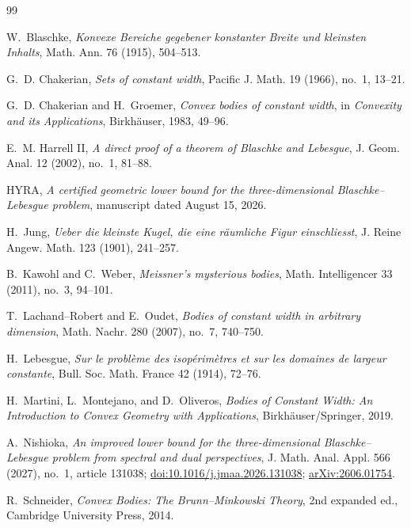 \documentclass[11pt,reqno]{amsart}
\theoremstyle{remark}
\begin{document}
\begin{thebibliography}{99}

W.~Blaschke,
\emph{Konvexe Bereiche gegebener konstanter Breite und kleinsten Inhalts},
Math. Ann. 76 (1915), 504--513.

G.~D. Chakerian,
\emph{Sets of constant width},
Pacific J. Math. 19 (1966), no.~1, 13--21.

G.~D. Chakerian and H.~Groemer,
\emph{Convex bodies of constant width},
in \emph{Convexity and its Applications}, Birkh\"auser, 1983, 49--96.

E.~M. Harrell II,
\emph{A direct proof of a theorem of Blaschke and Lebesgue},
J. Geom. Anal. 12 (2002), no.~1, 81--88.

HYRA,
\emph{A certified geometric lower bound for the three-dimensional
Blaschke--Lebesgue problem}, manuscript dated August 15, 2026.

H.~Jung,
\emph{Ueber die kleinste Kugel, die eine r\"aumliche Figur einschliesst},
J. Reine Angew. Math. 123 (1901), 241--257.

B.~Kawohl and C.~Weber,
\emph{Meissner's mysterious bodies},
Math. Intelligencer 33 (2011), no.~3, 94--101.

T.~Lachand--Robert and E.~Oudet,
\emph{Bodies of constant width in arbitrary dimension},
Math. Nachr. 280 (2007), no.~7, 740--750.

H.~Lebesgue,
\emph{Sur le probl\`eme des isop\'erim\`etres et sur les domaines de largeur constante},
Bull. Soc. Math. France 42 (1914), 72--76.

H.~Martini, L.~Montejano, and D.~Oliveros,
\emph{Bodies of Constant Width: An Introduction to Convex Geometry with
Applications}, Birkh\"auser/Springer, 2019.

A.~Nishioka,
\emph{An improved lower bound for the three-dimensional
Blaschke--Lebesgue problem from spectral and dual perspectives},
J. Math. Anal. Appl. 566 (2027), no.~1, article 131038;
\href{https://doi.org/10.1016/j.jmaa.2026.131038}{doi:10.1016/j.jmaa.2026.131038};
\href{https://arxiv.org/abs/2606.01754}{arXiv:2606.01754}.

R.~Schneider,
\emph{Convex Bodies: The Brunn--Minkowski Theory}, 2nd expanded ed.,
Cambridge University Press, 2014.

\end{thebibliography}
\end{document}
